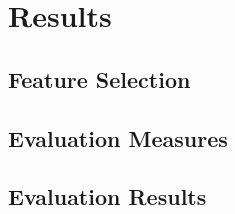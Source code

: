 \chapter{Results}
\label{chap:results}
\section{Feature Selection}
\section{Evaluation Measures}
\section{Evaluation Results}

\newpage


